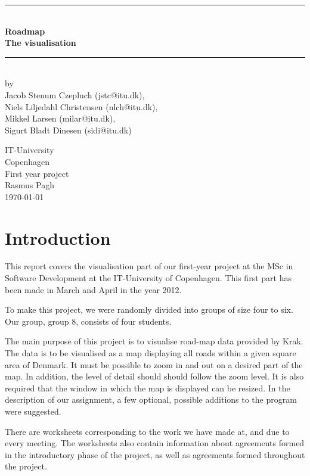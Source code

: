 \documentclass[a4paper,11pt]{article}
\begin{document}
\begin{titlepage}
\centering \parindent=0pt
\newcommand{\HRule}{\rule{\textwidth}{1mm}}
 \HRule\\[1cm]\Huge\bfseries
Roadmap\\[0.7cm]
\large The visualisation\\[1cm]
\HRule\\[4cm]  \large by \\Jacob Stenum Czepluch (jstc@itu.dk), \\Niels Liljedahl Christensen (nlch@itu.dk), \\Mikkel Larsen (milar@itu.dk), \\Sigurt Bladt Dinesen (sidi@itu.dk) \\
 \normalsize %
\begin{flushleft}
IT-University\\
Copenhagen\\
First year project\\
Rasmus Pagh\\
\today \end{flushleft}
\end{titlepage}

\tableofcontents
\pagebreak

\pagebreak
\section{Introduction}

This report covers the visualisation part of our first-year project at the MSc in Software Development at the IT-University of Copenhagen. This first part has been made in March and April in the year 2012. 

To make this project, we were randomly divided into groups of size four to six. Our group, group 8, consists of four students. 

The main purpose of this project is to visualise road-map data provided by Krak. The data is to be visualised as a map displaying all roads within a given square area of Denmark.
It must be possible to zoom in and out on a desired part of the map. In addition, the level of detail should should follow the zoom level. It is also required that the window in which the map is displayed can be resized. In the description of our assignment, a few  optional, possible additions to the program were suggested. 

There are worksheets corresponding to the work we have made at, and due to every meeting. The worksheets also contain information about agreements formed in the introductory phase of the project, as well as agreements formed throughout the project.
\end{document}
